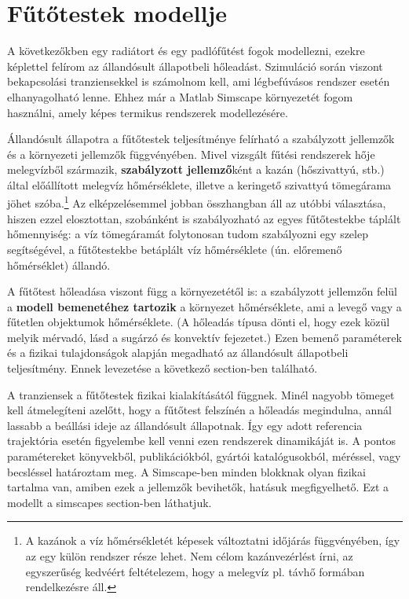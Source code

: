 \chapter{Fűtőtestek modellje}
A következőkben egy radiátort és egy padlófűtést fogok modellezni, ezekre képlettel felírom az állandósult állapotbeli hőleadást. Szimuláció során viszont bekapcsolási tranziensekkel is számolnom kell, ami légbefúvásos rendszer esetén elhanyagolható lenne. Ehhez már a Matlab Simscape környezetét fogom használni, amely képes termikus rendszerek modellezésére.

Állandósult állapotra a fűtőtestek teljesítménye felírható a szabályzott jellemzők és a környezeti jellemzők függvényében. Mivel vizsgált fűtési rendszerek hője melegvízből származik, \textbf{szabályzott jellemző}ként a kazán (hőszivattyú, stb.) által előállított melegvíz hőmérséklete, illetve a keringető szivattyú tömegárama jöhet szóba.\footnote{A kazánok a víz hőmérsékletét képesek változtatni időjárás függvényében, így az egy külön rendszer része lehet. Nem célom kazánvezérlést írni, az egyszerűség kedvéért feltételezem, hogy a melegvíz pl. távhő formában rendelkezésre áll.} Az elképzelésemmel jobban összhangban áll az utóbbi választása, hiszen ezzel elosztottan, szobánként is szabályozható az egyes fűtőtestekbe táplált hőmennyiség: a víz tömegáramát folytonosan tudom szabályozni egy szelep segítségével, a fűtőtestekbe betáplált víz hőmérséklete (ún. előremenő hőmérséklet) állandó.

A fűtőtest hőleadása viszont függ a környezetétől is: a szabályzott jellemzőn felül a \textbf{modell bemenetéhez tartozik} a környezet hőmérséklete, ami a levegő vagy a fűtetlen objektumok hőmérséklete. (A hőleadás típusa dönti el, hogy ezek közül melyik mérvadó, lásd a sugárzó és konvektív fejezetet.)
Ezen bemenő paraméterek és a fizikai tulajdonságok alapján megadható az állandósult állapotbeli teljesítmény. Ennek levezetése a következő section-ben található.

A tranziensek a fűtőtestek fizikai kialakításától függnek. Minél nagyobb tömeget kell átmelegíteni azelőtt, hogy a fűtőtest felszínén a hőleadás megindulna, annál lassabb a beállási ideje az állandósult állapotnak. Így egy adott referencia trajektória esetén figyelembe kell venni ezen rendszerek dinamikáját is. A pontos paramétereket könyvekből, publikációkból, gyártói katalógusokból, méréssel, vagy becsléssel határoztam meg. A Simscape-ben minden blokknak olyan fizikai tartalma van, amiben ezek a jellemzők bevihetők, hatásuk megfigyelhető. Ezt a modellt a simscapes section-ben láthatjuk.

